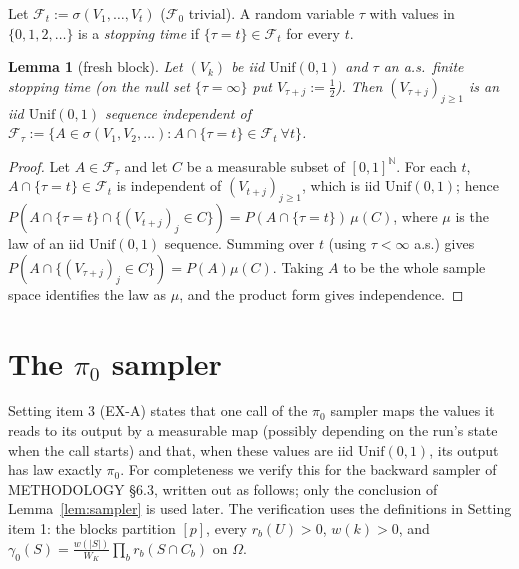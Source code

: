 \documentclass[11pt]{article}
\newtheorem{lemma}[theorem]{Lemma}
\theoremstyle{remark}
\newcommand{\cF}{\mathcal{F}}
\newcommand{\Unif}{\mathrm{Unif}(0,1)}
\newcommand{\1}{\mathbf{1}}
\begin{document}
Let $\cF_t:=\sigma(V_1,\dots,V_t)$ ($\cF_0$ trivial). A random variable $\tau$ with values in
$\{0,1,2,\dots\}$ is a \emph{stopping time} if $\{\tau=t\}\in\cF_t$ for every $t$.

\begin{lemma}[fresh block]\label{lem:fresh}
Let $(V_k)$ be iid $\Unif$ and $\tau$ an a.s.\ finite stopping time (on the null set $\{\tau=\infty\}$ put
$V_{\tau+j}:=\tfrac12$). Then $(V_{\tau+j})_{j\ge1}$ is an iid $\Unif$ sequence independent of
$\cF_\tau:=\{A\in\sigma(V_1,V_2,\dots):A\cap\{\tau=t\}\in\cF_t\ \forall t\}$.
\end{lemma}

\begin{proof}
Let $A\in\cF_\tau$ and let $C$ be a measurable subset of $[0,1]^{\mathbb N}$. For each $t$,
$A\cap\{\tau=t\}\in\cF_t$ is independent of $(V_{t+j})_{j\ge1}$, which is iid $\Unif$; hence
$P(A\cap\{\tau=t\}\cap\{(V_{t+j})_j\in C\})=P(A\cap\{\tau=t\})\,\mu(C)$, where $\mu$ is the law of an iid $\Unif$
sequence. Summing over $t$ (using $\tau<\infty$ a.s.) gives
$P(A\cap\{(V_{\tau+j})_j\in C\})=P(A)\mu(C)$. Taking $A$ to be the whole sample space identifies the law as $\mu$, and the product form
gives independence.
\end{proof}

\section{The $\pi_0$ sampler}

Setting item 3 (EX-A) states that one call of the $\pi_0$ sampler maps the values it reads to its output by a
measurable map (possibly depending on the run's state when the call starts) and that, when these values are iid
$\Unif$, its output has law exactly $\pi_0$. For completeness we verify this for the backward sampler of METHODOLOGY \S6.3, written out as follows; only the
conclusion of Lemma~\ref{lem:sampler} is used later. The verification uses the definitions in Setting item 1: the
blocks partition $[p]$, every $r_b(U)>0$, $w(k)>0$, and $\gamma_0(S)=\frac{w(|S|)}{W_K}\prod_br_b(S\cap C_b)$ on
$\Omega$.
\end{document}
